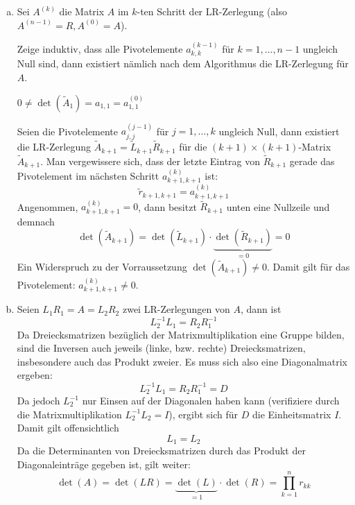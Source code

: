 \documentclass{mywork}
\begin{document}
\begin{aufgabe}
	\begin{enumerate}[a)]
		\item
			Sei $A^{(k)}$ die Matrix $A$ im $k$-ten Schritt der LR-Zerlegung (also $A^{(n-1)}=R, A^{(0)}=A$).

			Zeige induktiv, dass alle Pivotelemente $a_{k,k}^{(k-1)}$ für $k=1,\dotsc,n-1$ ungleich Null sind, dann existiert nämlich nach dem Algorithmus die LR-Zerlegung für $A$.

			\begin{seg}[Induktionsanfang ($n=1$)]
				$\displaystyle 0 \neq \det(\tilde A_1) = a_{1,1} = a_{1,1}^{(0)}$
			\end{seg}
			\begin{seg}[Induktionsschritt]
				Seien die Pivotelemente $a_{j,j}^{(j-1)}$ für $j=1,\dotsc,k$ ungleich Null, dann existiert die LR-Zerlegung $\tilde A_{k+1} = \tilde L_{k+1} \tilde R_{k+1}$ für die $(k+1)\times (k+1)$-Matrix $\tilde A_{k+1}$.
				Man vergewissere sich, dass der letzte Eintrag von $\tilde R_{k+1}$ gerade das Pivotelement im nächsten Schritt $a_{k+1,k+1}^{(k)}$ ist:
				\[
					\tilde r_{k+1,k+1} = a^{(k)}_{k+1,k+1}
				\]
				Angenommen, $a_{k+1,k+1}^{(k)} = 0$, dann besitzt $\tilde R_{k+1}$ unten eine Nullzeile und demnach
				\[
					\det(\tilde A_{k+1}) = \det(\tilde L_{k+1}) \cdot \underbrace{\det(\tilde R_{k+1})}_{=0} = 0
				\]
				Ein Widerspruch zu der Vorraussetzung $\det(\tilde A_{k+1}) \neq 0$.
				Damit gilt für das Pivotelement: $a_{k+1,k+1}^{(k)} \neq 0$.
			\end{seg}
		\item
			Seien $L_1R_1 = A = L_2R_2$ zwei LR-Zerlegungen von $A$, dann ist
			\[
				L_2^{-1}L_1 = R_2R_1^{-1}
			\]
			Da Dreiecksmatrizen bezüglich der Matrixmultiplikation eine Gruppe bilden, sind die Inversen auch jeweils (linke, bzw. rechte) Dreiecksmatrizen, insbesondere auch das Produkt zweier.
			Es muss sich also eine Diagonalmatrix ergeben: 
			\[
				L_2^{-1}L_1 = R_2R_1^{-1} = D
			\]
			Da jedoch $L_2^{-1}$ nur Einsen auf der Diagonalen haben kann (verifiziere durch die Matrixmultiplikation $L_2^{-1}L_2 = I$), ergibt sich für $D$ die Einheitsmatrix $I$.
			Damit gilt offensichtlich
			\[
				L_1 = L_2
			\]
			Da die Determinanten von Dreiecksmatrizen durch das Produkt der Diagonaleinträge gegeben ist, gilt weiter:
			\[
				\det(A) = \det(LR) = \underbrace{\det(L)}_{=1} \cdot \det(R) = \prod_{k=1}^n r_{kk}
			\]
	\end{enumerate}
\end{aufgabe}
\end{document}
